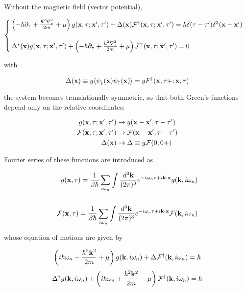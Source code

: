 Without the magnetic field (vector potential), 

\[
\begin{cases}
\left(-\hbar\partial_\tau + \frac{\hbar^2\nabla_x^2}{2m}+\mu\right)g({\bf x},\tau;{\bf x'},\tau')+\Delta({\bf x})\mathcal{F}^\dagger({\bf x},\tau;{\bf x'},\tau') = \hbar\delta(\tau-\tau')\delta^3({\bf x}-{\bf x}')\\
\ \\
\Delta^*({\bf x})g({\bf x},\tau;{\bf x'},\tau') + \left(-\hbar\partial_\tau + \frac{\hbar^2\nabla_x^2}{2m}+\mu\right)\mathcal{F}^\dagger({\bf x},\tau;{\bf x'},\tau')  = 0
\end{cases}
\]

with

\[\Delta({\bf x}) \equiv g\langle\psi_\downarrow({\bf x})\psi_\uparrow({\bf x})\rangle = g{F}^\dagger({\bf x},\tau+;{\bf x},\tau) \]

the system becomes translationally symmetric, so that both Green's functions depend only on the relative coordinates:

\[\begin{split}
g({\bf x},\tau;{\bf x'},\tau')&\rightarrow g({\bf x-x'},\tau-\tau')\\
\mathcal{F}({\bf x},\tau;{\bf x'},\tau')&\rightarrow\mathcal{F}({\bf x-x'},\tau-\tau')\\
\Delta({\bf x})&\rightarrow\Delta\equiv g\mathcal{F}(0,0+)
\end{split} \]

Fourier series of these functions are introduced as

\[\begin{split}
g({\bf x},\tau) = \frac{1}{\beta\hbar}\sum_{i\omega_n}\int\frac{d^3\bf k}{(2\pi)^3}e^{-i\omega_n\tau+i\bf k\cdot x}g({\bf k},i\omega_n)\\
\ \\
\mathcal{F}({\bf x},\tau) = \frac{1}{\beta\hbar}\sum_{i\omega_n}\int\frac{d^3\bf k}{(2\pi)^3}e^{-i\omega_n\tau+i\bf k\cdot x}\mathcal{F}({\bf k},i\omega_n)\\
\end{split}\]

whose equation of motions are given by

\[\left(i\hbar\omega_n-\frac{\hbar^2{\bf k}^2}{2m}+\mu\right)g({\bf k},i\omega_n)+\Delta\mathcal{F}^\dagger({\bf k},i\omega_n)=\hbar\]
\[\Delta^*g({\bf k},i\omega_n)+\left(i\hbar\omega_n+\frac{\hbar^2{\bf k}^2}{2m}-\mu\right)\mathcal{F}^\dagger({\bf k},i\omega_n)=\hbar\]

